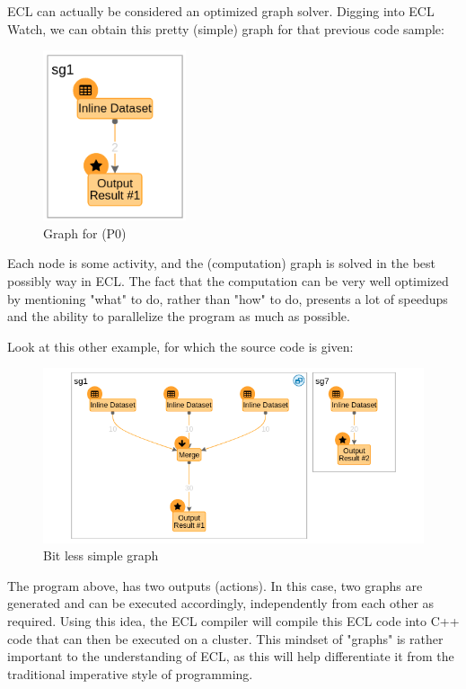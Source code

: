 \documentclass[a4paper,oneside,12pt]{book}
\begin{document}
ECL can actually be considered an optimized graph solver. Digging into ECL Watch, we can obtain this pretty (simple) graph for that previous code sample:
\begin{figure}[h]
    \centering
    \includegraphics[height=5cm]{../media/simplegraph}
    \caption{Graph for (P0)}
\end{figure}

Each node is some activity, and the (computation) graph is solved in the best possibly way in ECL. The fact that the computation can be very well optimized by mentioning "what" to do, rather than "how" to do, presents a lot of speedups and the ability to parallelize the program as much as possible.

Look at this other example, for which the source code is given:



\begin{figure}[h]
    \centering
    \includegraphics[width=.7\linewidth]{../media/bitlesssimplegraph.png}
    \caption{Bit less simple graph}
\end{figure}

The program above, has two outputs (actions). In this case, two graphs are generated and can be executed accordingly, independently from each other as required. Using this idea, the ECL compiler will compile this ECL code into C++ code that can then be executed on a cluster. This mindset of "graphs" is rather important to the understanding of ECL, as this will help differentiate it from the traditional imperative style of programming.
\end{document}
